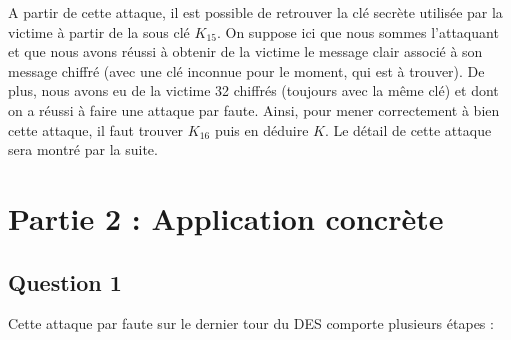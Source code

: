 \documentclass[11pt]{article}
\begin{document}
A partir de cette attaque, il est possible de retrouver la clé secrète utilisée par la victime à partir de la sous clé $K_{15}$. On suppose ici que nous sommes l'attaquant et que nous avons réussi à obtenir de la victime le message clair associé à son message chiffré (avec une clé inconnue pour le moment, qui est à trouver). De plus, nous avons eu de la victime 32 chiffrés (toujours avec la même clé) et dont on a réussi à faire une attaque par faute. Ainsi, pour mener correctement à bien cette attaque, il faut trouver $K_{16}$ puis en déduire $K$. Le détail de cette attaque sera montré par la suite. \newpage

\section{Partie 2 : Application concrète}

\subsection{Question 1}

Cette attaque par faute sur le dernier tour du DES comporte plusieurs étapes : 
\end{document}
